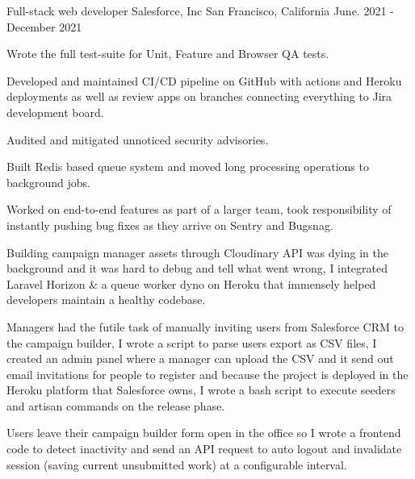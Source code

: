 

\begin{cventries}
  \cventry
    {Full-stack web developer} %
    {Salesforce, Inc} %
    {San Francisco, California} %
    {June. 2021 - December 2021} %
    {
      \begin{cvitems} %
        \item {Wrote the full test-suite for Unit, Feature and Browser QA tests.}
        \item {Developed and maintained CI/CD pipeline on GitHub with actions and Heroku deployments as well as review apps on branches connecting everything to Jira development board.}
        \item {Audited and mitigated unnoticed security advisories.}
        \item {Built Redis based queue system and moved long processing operations to background jobs.}
        \item {Worked on end-to-end features as part of a larger team, took responsibility of instantly pushing bug fixes as they arrive on Sentry and Bugsnag.}
        \item {Building campaign manager assets through Cloudinary API was dying in the background and it was hard to debug and tell what went wrong, I integrated Laravel Horizon \& a queue worker dyno on Heroku that immensely helped developers maintain a healthy codebase.}
        \item {Managers had the futile task of manually inviting users from Salesforce CRM to the campaign builder, I wrote a script to parse users export as CSV files, I created an admin panel where a manager can upload the CSV and it send out email invitations for people to register and because the project is deployed in the Heroku platform that Salesforce owns, I wrote a bash script to execute seeders and artisan commands on the release phase.}
        \item {Users leave their campaign builder form open in the office so I wrote a frontend code to detect inactivity and send an API request to auto logout and invalidate session (saving current unsubmitted work) at a configurable interval.}

\end{cvitems}}
\end{cventries}
